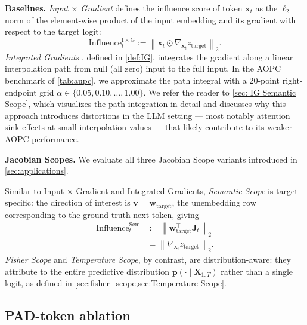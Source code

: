\documentclass{article}
\begin{document}
\noindent\textbf{Baselines.}
\emph{Input $\times$ Gradient} \cite{shrikumar2017learning} defines the 
influence score of token $\bm{x}_t$ as the $\ell_2$ norm of the 
element-wise product of the input embedding and its gradient with 
respect to the target logit:
\begin{equation}
    \mathrm{Influence}_t^{\mathrm{I \times G}} := 
    \left\| \bm{x}_t \odot \nabla_{\bm{x}_t} z_{\mathrm{target}} 
    \right\|_2.
\end{equation}
\emph{Integrated Gradients} \cite{Sundararajan-Axiomatic-Attribution-DNN-2017}, defined in \cref{def:IG}, integrates the gradient along a linear interpolation path from null (all zero) input to the full input.
In the AOPC benchmark of \cref{tab:aupc}, we approximate the path integral with a 20-point right-endpoint grid $\alpha \in \{0.05, 0.10, \ldots, 1.00\}$.
We refer the reader to 
\cref{sec: IG Semantic Scope}, which visualizes the path integration 
in detail and discusses why this approach introduces distortions in the 
LLM setting — most notably attention sink effects at small interpolation 
values — that likely contribute to its weaker AOPC performance.

\noindent\textbf{Jacobian Scopes.}
We evaluate all three Jacobian Scope variants introduced in \cref{sec:applications}.

Similar to Input $\times$ Gradient and Integrated Gradients, \emph{Semantic Scope} is target-specific: the direction of interest is $\bm{v} = \bm{w}_\mathrm{target}$, the unembedding row corresponding to the ground-truth next token, giving
\begin{equation}
\begin{aligned}
    \mathrm{Influence}_t^{\mathrm{Sem}} &:= \left\|\bm{w}_\mathrm{target}^\intercal \bm{J}_t\right\|_{2} \\
    &= \left\|\nabla_{\bm{x}_t} z_\mathrm{target}\right\|_{2}.
\end{aligned}
\end{equation}
\emph{Fisher Scope} and \emph{Temperature Scope}, by contrast, are distribution-aware: they attribute to the entire predictive distribution $\bm{p}(\cdot\mid\bm{X}_{1:T})$ rather than a single logit, as defined in \cref{sec:fisher_scope,sec:Temperature Scope}.

\subsection{PAD-token ablation}
\label{sec:pad_ablation}
\end{document}
